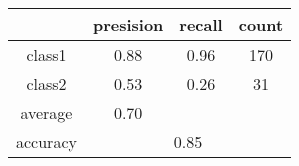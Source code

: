 
    \begin{tabular}{ | c | c | c | c | }
	\hline
	         &presision & recall & count \\ \hline
	class1   & 0.88    & 0.96  & 170 \\ \hline
	class2   & 0.53    & 0.26  & 31 \\ \hline
	average  & 0.70    &        &       \\
	\hline
	accuracy & \multicolumn{3}{c|}{0.85}\\
	\hline
    \end{tabular}